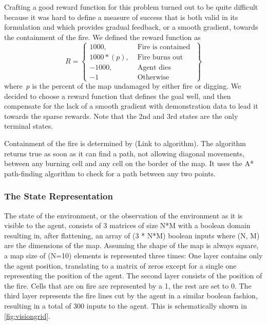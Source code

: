 Crafting a good reward function for this problem turned out to be quite difficult because it was hard to define a measure of success that is both valid in its formulation and which provides gradual feedback, or a smooth gradient, towards the containment of the fire. We defined the reward function as
\[
R = \left\{\begin{array}{lr}
    1000, & \text{ Fire is contained }\\
    1000 * (p), & \text{ Fire burns out }\\
    -1000, & \text{ Agent dies }\\
    -1 & \text{ Otherwise }

    \end{array}\right\}
\]
where~$p$ is the percent of the map undamaged by either fire or digging. We decided to choose a reward function that defines the goal well, and then compensate for the lack of a smooth gradient with demonstration data to lead it towards the sparse rewards. Note that the 2nd and 3rd states are the only terminal states.

Containment of the fire is determined by (Link to algorithm). The algorithm returns true as soon as it can find a path, not allowing diagonal movements, between any burning cell and any cell on the border of the map. It uses the A* path-finding algorithm to check for a path between any two points.



\subsubsection{The State Representation}\label{sec:state_rep}
The state of the environment, or the observation of the environment as it is visible to the agent, consists of 3 matrices of size N*M with a boolean domain resulting in, after flattening, an array of (3 * N*M) boolean inputs where (N, M) are the dimensions of the map. Assuming the shape of the map is always square, a map size of (N=10) elements is represented three times: One layer contains only the agent position, translating to a matrix of zeros except for a single one representing the position of the agent. The second layer consists of the position of the fire. Cells that are on fire are represented by a 1, the rest are set to 0. The third layer represents the fire lines cut by the agent in a similar boolean fashion, resulting in a total of 300 inputs to the agent. This is schematically shown in \ref{fig:visiongrid}.

